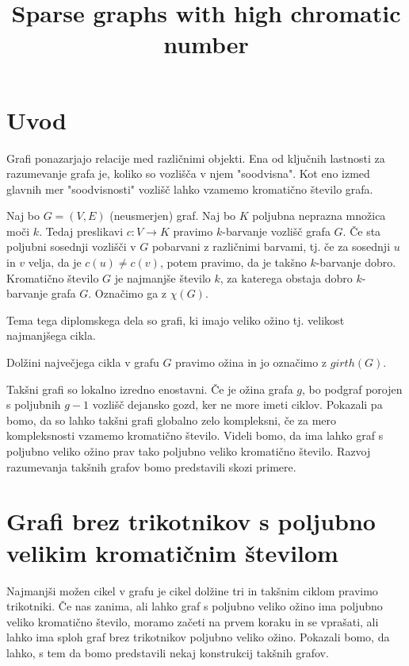 \documentclass[mat1, tisk]{fmfdelo}
\title{Sparse graphs with high chromatic number}
\begin{document}
\section{Uvod}
Grafi ponazarjajo relacije med različnimi objekti. Ena od ključnih lastnosti za razumevanje grafa je, koliko so vozlišča v njem "soodvisna". 
Kot eno izmed glavnih mer "soodvisnosti" vozlišč lahko vzamemo kromatično število grafa. 

    \begin{definicija}
        Naj bo $G = (V, E)$ (neusmerjen) graf. Naj bo $K$ poljubna neprazna množica moči $k$. Tedaj preslikavi $c: V \to K$ pravimo 
        $k$-barvanje vozlišč grafa $G$. Če sta poljubni sosednji vozlišči v $G$ pobarvani z različnimi barvami, tj. če za sosednji 
        $u$ in $v$ velja, da je $c(u) \neq c(v)$, potem pravimo, da je takšno $k$-barvanje dobro. Kromatično število $G$ je najmanjše
        število $k$, za katerega obstaja dobro $k$-barvanje grafa $G$. Označimo ga z $\chi(G)$.
    \end{definicija}

Tema tega diplomskega dela so grafi, ki imajo veliko ožino tj. velikost najmanjšega cikla. 

    \begin{definicija}
        Dolžini največjega cikla v grafu $G$ pravimo ožina in jo označimo z $girth(G)$.
    \end{definicija}

Takšni grafi so lokalno izredno enostavni. Če je ožina grafa $g$, bo podgraf porojen s poljubnih $g - 1$ vozlišč dejansko gozd, ker ne more 
imeti ciklov. Pokazali pa bomo, da so lahko takšni grafi globalno zelo kompleksni, če za mero kompleksnosti vzamemo kromatično število. 
Videli bomo, da ima lahko graf s poljubno veliko ožino prav tako poljubno veliko kromatično število. Razvoj razumevanja takšnih grafov 
bomo predstavili skozi primere.

\section{Grafi brez trikotnikov s poljubno velikim kromatičnim številom}
Najmanjši možen cikel v grafu je cikel dolžine tri in takšnim ciklom pravimo trikotniki. Če nas zanima, ali lahko graf s poljubno veliko
ožino ima poljubno veliko kromatično število, moramo začeti na prvem koraku in se vprašati, ali lahko ima sploh graf brez trikotnikov
poljubno veliko ožino. Pokazali bomo, da lahko, s tem da bomo predstavili nekaj konstrukcij takšnih grafov.
\end{document}
